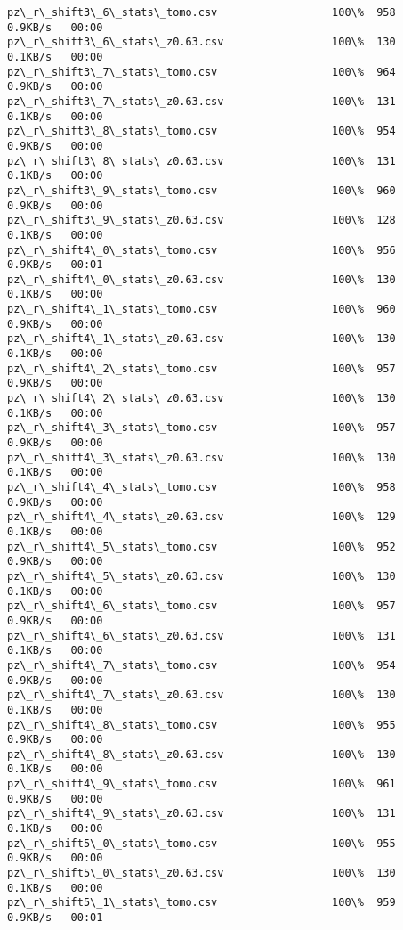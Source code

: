 \documentclass[11pt]{article}
\begin{document}
\begin{Verbatim}[commandchars=\\\{\}]
pz\_r\_shift3\_6\_stats\_tomo.csv                  100\%  958     0.9KB/s   00:00    
pz\_r\_shift3\_6\_stats\_z0.63.csv                 100\%  130     0.1KB/s   00:00    
pz\_r\_shift3\_7\_stats\_tomo.csv                  100\%  964     0.9KB/s   00:00    
pz\_r\_shift3\_7\_stats\_z0.63.csv                 100\%  131     0.1KB/s   00:00    
pz\_r\_shift3\_8\_stats\_tomo.csv                  100\%  954     0.9KB/s   00:00    
pz\_r\_shift3\_8\_stats\_z0.63.csv                 100\%  131     0.1KB/s   00:00    
pz\_r\_shift3\_9\_stats\_tomo.csv                  100\%  960     0.9KB/s   00:00    
pz\_r\_shift3\_9\_stats\_z0.63.csv                 100\%  128     0.1KB/s   00:00    
pz\_r\_shift4\_0\_stats\_tomo.csv                  100\%  956     0.9KB/s   00:01    
pz\_r\_shift4\_0\_stats\_z0.63.csv                 100\%  130     0.1KB/s   00:00    
pz\_r\_shift4\_1\_stats\_tomo.csv                  100\%  960     0.9KB/s   00:00    
pz\_r\_shift4\_1\_stats\_z0.63.csv                 100\%  130     0.1KB/s   00:00    
pz\_r\_shift4\_2\_stats\_tomo.csv                  100\%  957     0.9KB/s   00:00    
pz\_r\_shift4\_2\_stats\_z0.63.csv                 100\%  130     0.1KB/s   00:00    
pz\_r\_shift4\_3\_stats\_tomo.csv                  100\%  957     0.9KB/s   00:00    
pz\_r\_shift4\_3\_stats\_z0.63.csv                 100\%  130     0.1KB/s   00:00    
pz\_r\_shift4\_4\_stats\_tomo.csv                  100\%  958     0.9KB/s   00:00    
pz\_r\_shift4\_4\_stats\_z0.63.csv                 100\%  129     0.1KB/s   00:00    
pz\_r\_shift4\_5\_stats\_tomo.csv                  100\%  952     0.9KB/s   00:00    
pz\_r\_shift4\_5\_stats\_z0.63.csv                 100\%  130     0.1KB/s   00:00    
pz\_r\_shift4\_6\_stats\_tomo.csv                  100\%  957     0.9KB/s   00:00    
pz\_r\_shift4\_6\_stats\_z0.63.csv                 100\%  131     0.1KB/s   00:00    
pz\_r\_shift4\_7\_stats\_tomo.csv                  100\%  954     0.9KB/s   00:00    
pz\_r\_shift4\_7\_stats\_z0.63.csv                 100\%  130     0.1KB/s   00:00    
pz\_r\_shift4\_8\_stats\_tomo.csv                  100\%  955     0.9KB/s   00:00    
pz\_r\_shift4\_8\_stats\_z0.63.csv                 100\%  130     0.1KB/s   00:00    
pz\_r\_shift4\_9\_stats\_tomo.csv                  100\%  961     0.9KB/s   00:00    
pz\_r\_shift4\_9\_stats\_z0.63.csv                 100\%  131     0.1KB/s   00:00    
pz\_r\_shift5\_0\_stats\_tomo.csv                  100\%  955     0.9KB/s   00:00    
pz\_r\_shift5\_0\_stats\_z0.63.csv                 100\%  130     0.1KB/s   00:00    
pz\_r\_shift5\_1\_stats\_tomo.csv                  100\%  959     0.9KB/s   00:01    

\end{Verbatim}
\end{document}
